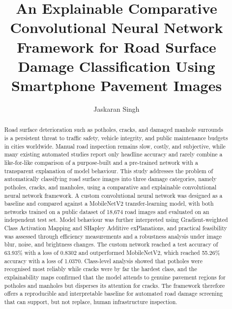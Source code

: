 \documentclass[preprint,12pt]{elsarticle}
\begin{document}
\begin{frontmatter}

\title{An Explainable Comparative Convolutional Neural Network Framework for Road Surface Damage Classification Using Smartphone Pavement Images}

\author[label1]{Jaskaran Singh}

\begin{abstract}
Road surface deterioration such as potholes, cracks, and damaged manhole surrounds is a persistent threat to traffic safety, vehicle integrity, and public maintenance budgets in cities worldwide.
Manual road inspection remains slow, costly, and subjective, while many existing automated studies report only headline accuracy and rarely combine a like-for-like comparison of a purpose-built and a pre-trained network with a transparent explanation of model behaviour.
This study addresses the problem of automatically classifying road surface images into three damage categories, namely potholes, cracks, and manholes, using a comparative and explainable convolutional neural network framework.
A custom convolutional neural network was designed as a baseline and compared against a MobileNetV2 transfer-learning model, with both networks trained on a public dataset of 18{,}674 road images and evaluated on an independent test set.
Model behaviour was further interpreted using Gradient-weighted Class Activation Mapping and SHapley Additive exPlanations, and practical feasibility was assessed through efficiency measurements and a robustness analysis under image blur, noise, and brightness changes.
The custom network reached a test accuracy of 63.93\% with a loss of 0.8302 and outperformed MobileNetV2, which reached 55.26\% accuracy with a loss of 1.0370.
Class-level analysis showed that potholes were recognised most reliably while cracks were by far the hardest class, and the explainability maps confirmed that the model attends to genuine pavement regions for potholes and manholes but disperses its attention for cracks.
The framework therefore offers a reproducible and interpretable baseline for automated road damage screening that can support, but not replace, human infrastructure inspection.
\end{abstract}


\end{frontmatter}
\end{document}
